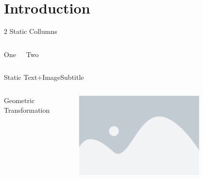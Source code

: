   \section{Introduction}

\begin{frame}{2 Static Collumns}
    \vfill
    \begin{columns}

        \begin{center}
        {\Huge{} One\par}
        \end{center}

        \begin{center}
        {\Huge{} Two\par}
        \end{center}
    \end{columns}

    \vfill
  \end{frame}

  \begin{frame}{Static Text+Image}{Subtitle}

        \begin{columns}

            { \flushleft \Huge  Geometric Transformation\par}

            \begin{figure}[h]
                \centering
                \includegraphics[width=0.8\textwidth,trim=4 4 4 4,clip]{resources/placeholder.png}
            \end{figure}

        \end{columns}
    
  \end{frame}

